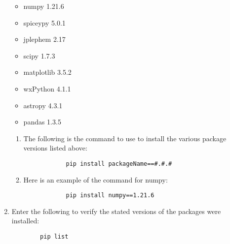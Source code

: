 \begin{enumerate}
	\begin{itemize}
		\item numpy 1.21.6
		\item spiceypy 5.0.1
		\item jplephem 2.17
		\item scipy 1.7.3
		\item matplotlib 3.5.2
		\item wxPython 4.1.1
		\item astropy 4.3.1
		\item pandas 1.3.5
	\end{itemize}
	\begin{enumerate}
		\item The following is the command to use to install the various package versions listed above:\\
		\begin{verbatim}
			pip install packageName==#.#.#
		\end{verbatim}
		\item Here is an example of the command for numpy:
		\begin{verbatim}
			pip install numpy==1.21.6
		\end{verbatim}
	\end{enumerate}
	\item Enter the following to verify the stated versions of the packages were installed: \\
	\begin{verbatim}
		pip list
	\end{verbatim}	
\end{enumerate}
